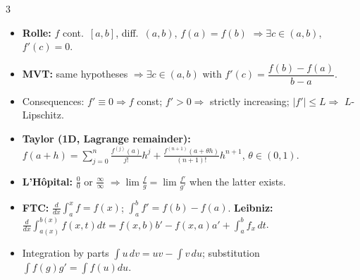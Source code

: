\documentclass[8pt,letterpaper]{article}
\newenvironment{tl}
  {\begin{itemize}[leftmargin=6pt,itemsep=0.3pt,topsep=1pt,parsep=0pt,
                   partopsep=0pt,label=\textcolor{gray}{\tiny$\bullet$}]}
  {\end{itemize}}
\begin{document}
\begin{multicols}{3}
\begin{tl}
\item \textbf{Rolle:} $f$ cont.\ $[a,b]$, diff.\ $(a,b)$, $f(a)=f(b)$ $\Rightarrow\exists c\in(a,b)$, $f'(c)=0$.
\item \textbf{MVT:} same hypotheses $\Rightarrow\exists c\in(a,b)$ with $f'(c)=\dfrac{f(b)-f(a)}{b-a}$.
\item Consequences: $f'\equiv0\Rightarrow f$ const; $f'>0\Rightarrow$ strictly increasing; $|f'|\le L\Rightarrow$ $L$-Lipschitz.
\item \textbf{Taylor (1D, Lagrange remainder):} $f(a+h)=\sum_{j=0}^{n}\frac{f^{(j)}(a)}{j!}h^j+\frac{f^{(n+1)}(a+\theta h)}{(n+1)!}h^{n+1}$, $\theta\in(0,1)$.
\item \textbf{L'H\^opital:} $\frac00$ or $\frac\infty\infty$ $\Rightarrow\lim\frac fg=\lim\frac{f'}{g'}$ when the latter exists.
\item \textbf{FTC:} $\frac{d}{dx}\int_a^xf=f(x)$; $\int_a^bf'=f(b)-f(a)$. \textbf{Leibniz:} $\frac{d}{dx}\int_{a(x)}^{b(x)}f(x,t)dt=f(x,b)b'-f(x,a)a'+\int_a^b f_x\,dt$.
\item Integration by parts $\int u\,dv=uv-\int v\,du$; substitution $\int f(g)g'=\int f(u)du$.
\end{tl}


\end{multicols}
\end{document}
